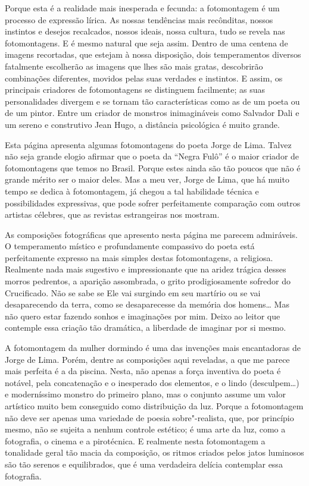 Porque esta é a realidade mais inesperada e fecunda: a fotomontagem é um
processo de expressão lírica. As nossas tendências mais recônditas,
nossos instintos e desejos recalcados, nossos ideais, nossa cultura,
tudo se revela nas fotomontagens. E é mesmo natural que seja assim.
Dentro de uma centena de imagens recortadas, que estejam à nossa
disposição, dois temperamentos diversos fatalmente escolherão as imagens
que lhes são mais gratas, descobrirão combinações diferentes, movidos
pelas suas verdades e instintos. E assim, os principais criadores de
fotomontagens se distinguem facilmente; as suas personalidades divergem
e se tornam tão características como as de um poeta ou de um pintor.
Entre um criador de monstros inimagináveis como Salvador Dali e um
sereno e construtivo Jean Hugo, a distância psicológica é muito grande.

Esta página apresenta algumas fotomontagens do poeta Jorge de Lima.
Talvez não seja grande elogio afirmar que o poeta da ``Negra Fulô'' é o
maior criador de fotomontagens que temos no Brasil. Porque estes ainda
são tão poucos que não é grande mérito ser o maior deles. Mas a meu ver,
Jorge de Lima, que há muito tempo se dedica à fotomontagem, já chegou a
tal habilidade técnica e possibilidades expressivas, que pode sofrer
perfeitamente comparação com outros artistas célebres, que as revistas
estrangeiras nos mostram.

As composições fotográficas que apresento nesta página me parecem
admiráveis. O temperamento místico e profundamente compassivo do poeta
está perfeitamente expresso na mais simples destas fotomontagens, a
religiosa. Realmente nada mais sugestivo e impressionante que na aridez
trágica desses morros pedrentos, a aparição assombrada, o grito
prodigiosamente sofredor do Crucificado. Não se sabe se Ele vai surgindo
em seu martírio ou se vai desaparecendo da terra, como se desaparecesse
da memória dos homens\ldots{} Mas não quero estar fazendo sonhos e
imaginações por mim. Deixo ao leitor que contemple essa criação tão
dramática, a liberdade de imaginar por si mesmo.

A fotomontagem da mulher dormindo é uma das invenções mais encantadoras
de Jorge de Lima. Porém, dentre as composições aqui reveladas, a que me
parece mais perfeita é a da piscina. Nesta, não apenas a força inventiva
do poeta é notável, pela concatenação e o inesperado dos elementos, e o
lindo (desculpem\ldots{}) e moderníssimo monstro do primeiro plano, mas o
conjunto assume um valor artístico muito bem conseguido como
distribuição da luz. Porque a fotomontagem não deve ser apenas uma
variedade de poesia sobre"-realista, que, por princípio mesmo, não se
sujeita a nenhum controle estético; é uma arte da luz, como a
fotografia, o cinema e a pirotécnica. E realmente nesta fotomontagem a
tonalidade geral tão macia da composição, os ritmos criados pelos jatos
luminosos são tão serenos e equilibrados, que é uma verdadeira delícia
contemplar essa fotografia.

